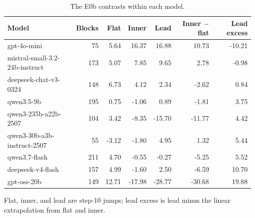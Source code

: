 \begin{table}[t]
\centering
\caption{The E0b contrasts within each model.}
\label{tab:matchede0bmodel}
\small
\begin{tabular}{lrrrrrr}
\toprule
Model & Blocks & Flat & Inner & Lead & Inner $-$ flat & Lead excess \\
\midrule
gpt-4o-mini &  75 & 5.64 & 16.37 & 16.88 & 10.73 & -10.21 \\
mistral-small-3.2-24b-instruct & 173 & 5.07 & 7.85 & 9.65 & 2.78 & -0.98 \\
deepseek-chat-v3-0324 & 148 & 6.73 & 4.12 & 2.34 & -2.62 & 0.84 \\
qwen3.5-9b & 195 & 0.75 & -1.06 & 0.89 & -1.81 & 3.75 \\
qwen3-235b-a22b-2507 & 104 & 3.42 & -8.35 & -15.70 & -11.77 & 4.42 \\
qwen3-30b-a3b-instruct-2507 &  55 & -3.12 & -1.80 & 4.95 & 1.32 & 5.44 \\
qwen3.7-flash & 211 & 4.70 & -0.55 & -0.27 & -5.25 & 5.52 \\
deepseek-v4-flash & 157 & 4.99 & -1.60 & 2.50 & -6.59 & 10.70 \\
gpt-oss-20b & 149 & 12.71 & -17.98 & -28.77 & -30.68 & 19.88 \\
\bottomrule
\end{tabular}
\vspace{2pt}
\parbox{\linewidth}{\footnotesize Flat, inner, and lead are step-10 jumps; lead excess is lead minus the linear extrapolation from flat and inner.}
\end{table}
